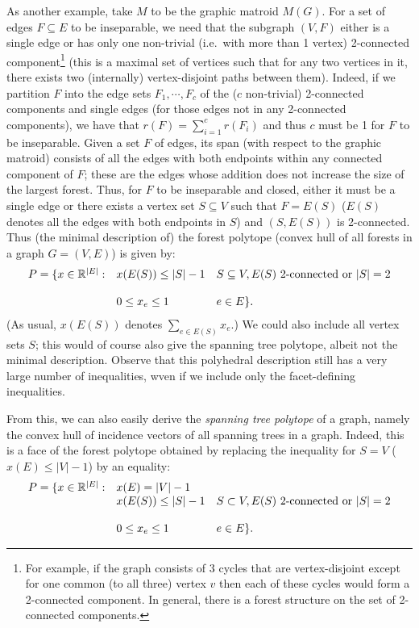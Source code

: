 \documentclass[12pt]{article}
\begin{document}
As another example, take $M$ to be the graphic matroid $M(G)$. For a
set of edges $F\subseteq E$ to be inseparable, we need that the
subgraph $(V,F)$ either is a single edge or has only one non-trivial
(i.e.\ with more than 1 vertex) 2-connected component\footnote{For example, if the graph consists of 3 cycles that are vertex-disjoint except for one common (to all three) vertex $v$ then each of these cycles would form a 2-connected component. In general, there is a forest structure on the set of 2-connected components.} (this is a
maximal set of vertices such that for any two vertices in it, there
exists two (internally) vertex-disjoint paths between them).   Indeed,
if we partition $F$ into the edge sets $F_1, \cdots, F_c$ of the ($c$
non-trivial) 2-connected components and single edges (for those edges
not in any 2-connected components), we have that $r(F)=\sum_{i=1}^c
r(F_i)$ and thus $c$ must be 1 for $F$ to be inseparable. Given a set
$F$ of edges, its span (with respect to the graphic matroid) consists
of all the edges with both endpoints within any connected
component of $F$; these are the edges whose addition does not increase
the size of the largest forest. Thus, for $F$ to be inseparable and
closed, either it must be a single edge or there exists a vertex set $S\subseteq V$
such that $F=E(S)$ ($E(S)$ denotes all the edges with both endpoints
in $S$) and $(S,E(S))$ is 2-connected. Thus (the minimal description of) the forest polytope
(convex hull of all forests in a graph $G=(V,E)$) is given by:
$$\begin{array}{rll} P = \{x\in {\mathbb R}^{|E|}: & x(E(S)) \leq |S|-1 &
S\subseteq V, E(S) \mbox{
  2-connected or } |S|=2\\
\\
& 0\leq x_e\leq 1 & e\in E\}.
\end{array}$$
(As usual, $x(E(S))$ denotes $\sum_{e\in E(S)} x_e$.) We could also include all vertex sets $S$; this would of course also give the spanning tree polytope, albeit not the minimal description. 
Observe that this polyhedral description still has a very large number
of inequalities, wven if we include only the facet-defining inequalities. 

From this, we can also easily derive the {\it spanning tree polytope}
of a graph, namely the convex hull of incidence vectors of all
spanning trees in a graph. Indeed, this is a face of the forest
polytope obtained by replacing the inequality for $S=V$ ($x(E) \leq
|V|-1$) by an equality:
$$\begin{array}{rll} 
P = \{x\in {\mathbb R}^{|E|}: & x(E) = |V|-1 \\
 & x(E(S)) \leq |S|-1 & S\subset V, E(S) \mbox{
  2-connected or }|S|=2\\
\\
& 0\leq x_e\leq 1  & e\in E\}.
\end{array}$$
\end{document}
